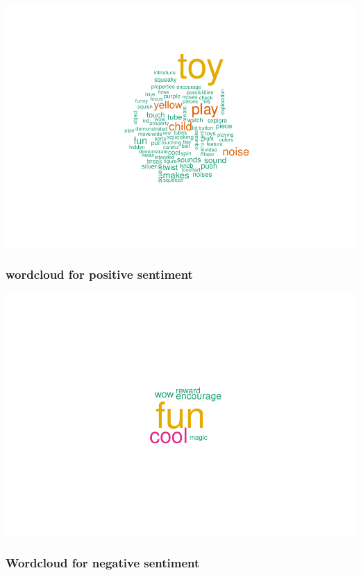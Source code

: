 \documentclass[
  english,
  man]{apa6}
\begin{document}
\includegraphics{capstone640_files/figure-latex/unnamed-chunk-1-1.pdf}

\hypertarget{wordcloud-for-positive-sentiment}{%
\subsubsection{wordcloud for positive sentiment}\label{wordcloud-for-positive-sentiment}}

\includegraphics{capstone640_files/figure-latex/unnamed-chunk-2-1.pdf}

\hypertarget{wordcloud-for-negative-sentiment}{%
\subsubsection{Wordcloud for negative sentiment}\label{wordcloud-for-negative-sentiment}}
\end{document}
